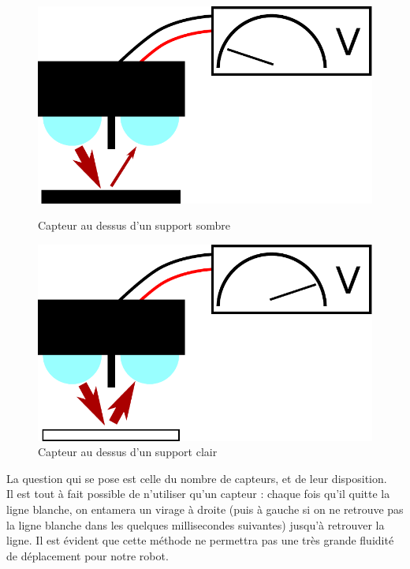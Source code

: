 		\begin{figure}[H]
			\centering
			\begin{minipage}{0.48\textwidth}
				\centering
				\includegraphics[scale=0.45]{Graphics/capteurOptiqueFondNoir.pdf}
				\caption{Capteur au dessus d'un support sombre}
			\end{minipage}\hfill
			\begin{minipage}{0.48\textwidth}
				\centering
				\includegraphics[scale=0.45]{Graphics/capteurOptiqueFondBlanc.pdf}
				\caption{Capteur au dessus d'un support clair}
			\end{minipage}
		\end{figure}

		La question qui se pose est celle du nombre de capteurs, et de leur disposition.\\

		Il est tout à fait possible de n'utiliser qu'un capteur : chaque fois qu'il quitte la ligne blanche, on entamera un virage à droite (puis à gauche si on ne retrouve pas la ligne blanche dans les quelques millisecondes suivantes) jusqu'à retrouver la ligne. Il est évident que cette méthode ne permettra pas une très grande fluidité de déplacement pour notre robot.

